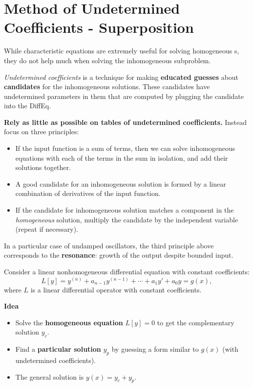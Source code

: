 \section{Method of Undetermined Coefficients - Superposition}
  \begin{weekintro}
    While characteristic equations are extremely useful for solving homogeneous \ode{}s, they do not help much when solving the inhomogeneous subproblem.

    \emph{Undetermined coefficients} is a technique for making \textbf{educated guesses} about \textbf{candidates} for the inhomogeneous solutions. These candidates have undetermined parameters in them that are computed by plugging the candidate into the DiffEq.

    \textbf{Rely as little as possible on tables of undetermined coefficients.} Instead focus on three principles:
    \begin{itemize}
      \item If the input function is a sum of terms, then we can solve inhomogeneous equations with each of the terms in the sum in isolation, and add their solutions together.
      \item A good candidate for an inhomogeneous solution is formed by a linear combination of derivatives of the input function.
      \item If the candidate for inhomogeneous solution matches a component in the \emph{homogeneous} solution, multiply the candidate by the independent variable (repeat if necessary).
    \end{itemize}

    In a particular case of undamped oscillators, the third principle above corresponds to the \textbf{resonance}: growth of the output despite bounded input.
  \end{weekintro}


  Consider a linear nonhomogeneous differential equation with constant coefficients:
  \[
  L[y] = y^{(n)} + a_{n-1} y^{(n-1)} + \cdots + a_1 y' + a_0 y = g(x),
  \]
  where $L$ is a linear differential operator with constant coefficients.



  \textbf{Idea}

  \begin{itemize}
    \item Solve the \textbf{homogeneous equation} $L[y]=0$ to get the complementary solution $y_c$.
    \item Find a \textbf{particular solution} $y_p$ by guessing a form similar to $g(x)$ (with undetermined coefficients).
    \item The general solution is $y(x)=y_c+y_p$.
  \end{itemize}



